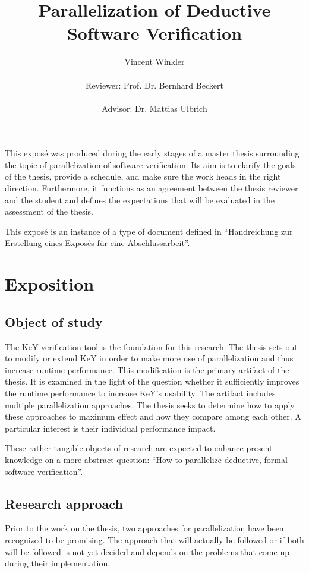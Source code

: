 \documentclass{scrartcl}
\title{Parallelization of Deductive Software Verification}
\author{
    Vincent Winkler\\
    \vspace{1em}\\
    Reviewer: Prof. Dr. Bernhard Beckert\\
    \vspace{1em}\\
    Advisor: Dr. Mattias Ulbrich
}
\begin{document}
\maketitle

This exposé was produced during the early stages of a master thesis
surrounding the topic of parallelization of software verification.
Its aim is to clarify the goals of the thesis, provide a schedule,
and make sure the work heads in the right direction.
Furthermore, it functions as an agreement between the thesis reviewer and the student
and defines the expectations that will be evaluated in the assessment of the thesis.

This exposé is an instance of a type of document defined in
\enquote{Handreichung zur Erstellung eines Exposés für eine Abschlussarbeit}.

\section{Exposition}
\subsection{Object of study}
The KeY verification tool is the foundation for this research.
The thesis sets out to modify or extend KeY in order to make more use of parallelization
and thus increase runtime performance.
This modification is the primary artifact of the thesis.
It is examined in the light of the question whether it sufficiently improves the runtime
performance to increase KeY's usability.
The artifact includes multiple parallelization approaches.
The thesis seeks to determine how to apply these approaches to maximum effect
and how they compare among each other.
A particular interest is their individual performance impact.

These rather tangible objects of research are expected
to enhance present knowledge on a more abstract question:
\enquote{How to parallelize deductive, formal software verification}.

\subsection{Research approach}
Prior to the work on the thesis,
two approaches for parallelization have been recognized to be promising.
The approach that will actually be followed
or if both will be followed is not yet decided
and depends on the problems that come up during their implementation.
\end{document}
